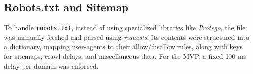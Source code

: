 
\subsection{Robots.txt and Sitemap}

To handle \texttt{robots.txt}, instead of using specialized libraries like \textit{Protego}, the file was manually fetched and parsed using \textit{requests}. Its contents were structured into a dictionary, mapping user-agents to their allow/disallow rules, along with keys for sitemaps, crawl delays, and miscellaneous data. For the MVP, a fixed 100 ms delay per domain was enforced.


